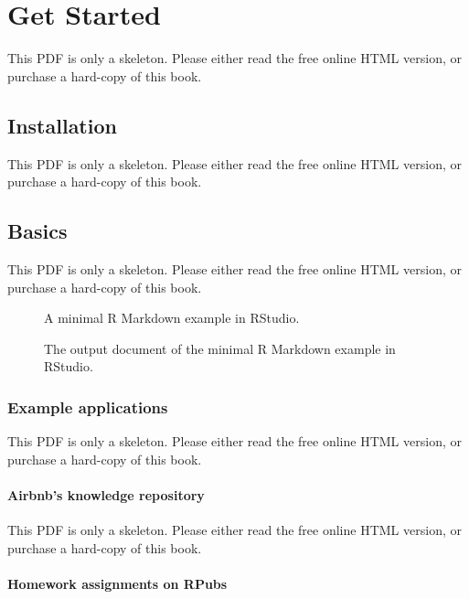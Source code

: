 \documentclass[
  11pt,
]{krantz}
\theoremstyle{definition}
\theoremstyle{definition}
\theoremstyle{definition}
\theoremstyle{definition}
\theoremstyle{remark}
\begin{document}
\mainmatter
\part{Get Started}\label{part-get-started}

This PDF is only a skeleton. Please either read the free online HTML version, or purchase a hard-copy of this book.

\chapter{Installation}\label{installation}

This PDF is only a skeleton. Please either read the free online HTML version, or purchase a hard-copy of this book.

\chapter{Basics}\label{basics}

This PDF is only a skeleton. Please either read the free online HTML version, or purchase a hard-copy of this book.

\begin{figure}\caption{A minimal R Markdown example in RStudio.}\end{figure}

\begin{figure}\caption{The output document of the minimal R Markdown example in RStudio.}\end{figure}

\section{Example applications}\label{basics-examples}

This PDF is only a skeleton. Please either read the free online HTML version, or purchase a hard-copy of this book.

\subsection{Airbnb's knowledge repository}\label{airbnbs-knowledge-repository}

This PDF is only a skeleton. Please either read the free online HTML version, or purchase a hard-copy of this book.

\subsection{Homework assignments on RPubs}\label{homework-assignments-on-rpubs}
\end{document}
